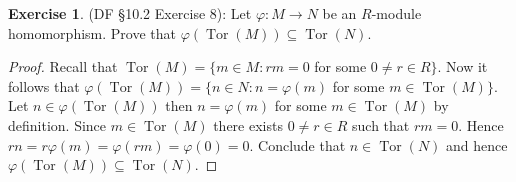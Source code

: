 \documentclass[8pt]{amsart}
\theoremstyle{plain}%
\theoremstyle{definition}
\newtheorem{exercise}{Exercise}[section]
\theoremstyle{remark}
\numberwithin{equation}{section}
\begin{document}
\begin{exercise}
(DF \S 10.2 Exercise 8): Let $\varphi : M \to N$ be an $R$-module homomorphism. Prove that $\varphi(\operatorname{Tor}(M)) \subseteq \operatorname{Tor}(N)$.
	\begin{proof}
		Recall that $\operatorname{Tor}(M) = \{m \in M : rm = 0$ for some $0 \neq r \in R\}$. Now it follows that $\varphi(\operatorname{Tor}(M)) = \{n \in N : n = \varphi(m)$ for some $m \in \operatorname{Tor}(M)\}$. Let $n \in \varphi(\operatorname{Tor}(M))$ then $n = \varphi(m)$ for some $m \in \operatorname{Tor}(M)$ by definition. Since $m \in \operatorname{Tor}(M)$ there exists $0 \neq r \in R$ such that $rm = 0$. Hence $rn = r \varphi(m) = \varphi(rm) = \varphi(0) = 0$. Conclude that $n \in \operatorname{Tor}(N)$ and hence $\varphi(\operatorname{Tor}(M)) \subseteq \operatorname{Tor}(N)$.
	\end{proof}
\end{exercise}
\end{document}
